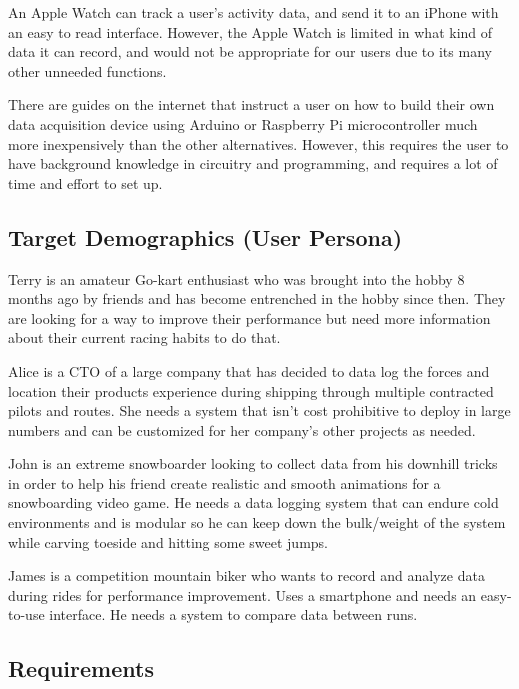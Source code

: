 An Apple Watch can track a user's activity data, and send it to an
iPhone with an easy to read interface. However, the Apple Watch is
limited in what kind of data it can record, and would not be appropriate
for our users due to its many other unneeded functions.

There are guides on the internet that instruct a user on how to build
their own data acquisition device using Arduino or Raspberry Pi
microcontroller much more inexpensively than the other alternatives.
However, this requires the user to have background knowledge in
circuitry and programming, and requires a lot of time and effort to set
up.

\hypertarget{target-demographics-user-persona}{%
\subsection{Target Demographics (User
Persona)}\label{target-demographics-user-persona}}

Terry is an amateur Go-kart enthusiast who was brought into the hobby 8
months ago by friends and has become entrenched in the hobby since then.
They are looking for a way to improve their performance but need more
information about their current racing habits to do that.

Alice is a CTO of a large company that has decided to data log the
forces and location their products experience during shipping through
multiple contracted pilots and routes. She needs a system that isn't
cost prohibitive to deploy in large numbers and can be customized for
her company's other projects as needed.

John is an extreme snowboarder looking to collect data from his downhill
tricks in order to help his friend create realistic and smooth
animations for a snowboarding video game. He needs a data logging system
that can endure cold environments and is modular so he can keep down the
bulk/weight of the system while carving toeside and hitting some sweet
jumps.

James is a competition mountain biker who wants to record and analyze
data during rides for performance improvement. Uses a smartphone and
needs an easy-to-use interface. He needs a system to compare data
between runs.

\hypertarget{requirements}{%
\subsection{Requirements}\label{requirements}}

